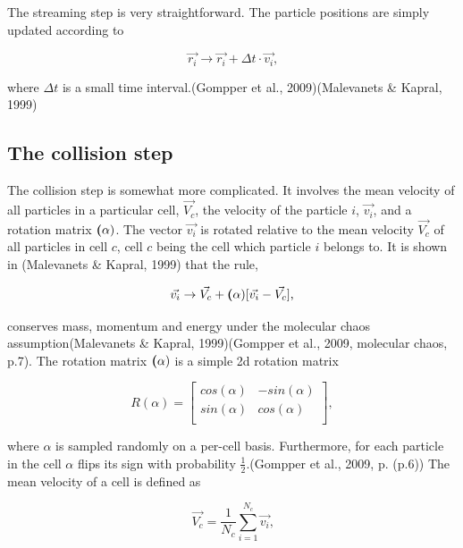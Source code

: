 \documentclass[
]{article}
\begin{document}
The streaming step is very straightforward. The particle positions are
simply updated according to

\begin{equation}
\vec{r_{i}} \rightarrow \vec{r_{i}} + \Delta t \cdot \vec{v_{i}}\textrm{,}
\end{equation}

where \(\Delta t\) is a small time interval.(Gompper et al.,
2009)(Malevanets \& Kapral, 1999)

\hypertarget{the-collision-step}{%
\subsection{The collision step}\label{the-collision-step}}

The collision step is somewhat more complicated. It involves the mean
velocity of all particles in a particular cell, \(\vec{V_c}\), the
velocity of the particle \(i\), \(\vec{v_i}\), and a rotation matrix
\(\textbf(\alpha)\). The vector \(\vec{v_i}\) is rotated relative to the
mean velocity \(\vec{V_c}\) of all particles in cell \(c\), cell \(c\)
being the cell which particle \(i\) belongs to. It is shown in
(Malevanets \& Kapral, 1999) that the rule,

\begin{equation}
\vec{v_i} \rightarrow \vec{V_c} + \textbf(\alpha) [\vec{v_i} - \vec{V_c}] \textrm{,}
\end{equation}

conserves mass, momentum and energy under the molecular chaos
assumption(Malevanets \& Kapral, 1999)(Gompper et al., 2009, molecular
chaos, p.7). The rotation matrix \(\textbf(\alpha)\) is a simple 2d
rotation matrix

\begin{equation}
R(\alpha) = 
\left[ \begin{array}{rr}
cos(\alpha) & -sin(\alpha) \\
sin(\alpha) & cos(\alpha) \\
\end{array}\right],
\end{equation}

where \(\alpha\) is sampled randomly on a per-cell basis. Furthermore,
for each particle in the cell \(\alpha\) flips its sign with probability
\(\frac{1}{2}\).(Gompper et al., 2009, p. (p.6)) The mean velocity of a
cell is defined as

\begin{equation}
\vec{V_c} = \frac{1}{N_c} \sum_{i=1}^{N_c} \vec{v_i} \textrm{,}
\end{equation}
\end{document}
